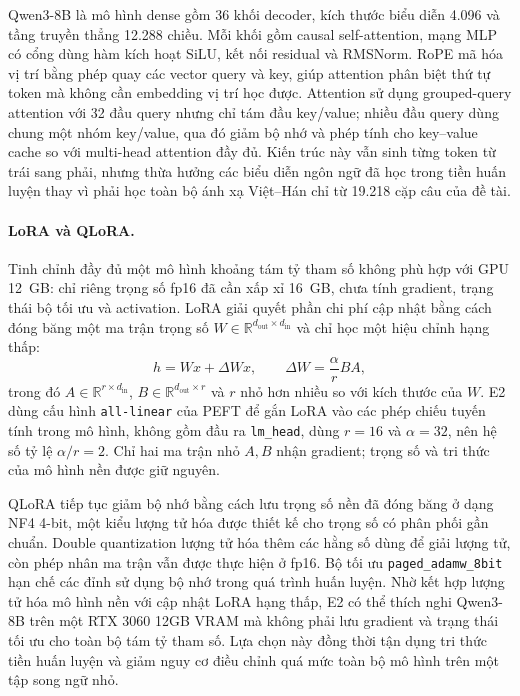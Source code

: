 \documentclass[11pt,twocolumn]{article}
\begin{document}
Qwen3-8B là mô hình dense gồm 36 khối decoder, kích thước biểu diễn 4.096 và
tầng truyền thẳng 12.288 chiều. Mỗi khối gồm causal self-attention, mạng MLP có
cổng dùng hàm kích hoạt SiLU, kết nối residual và RMSNorm. RoPE mã hóa vị trí
bằng phép quay các vector query và key, giúp attention phân biệt thứ tự token
mà không cần embedding vị trí học được. Attention sử dụng grouped-query
attention với 32 đầu query nhưng chỉ tám đầu key/value; nhiều đầu query dùng
chung một nhóm key/value, qua đó giảm bộ nhớ và phép tính cho key--value cache
so với multi-head attention đầy đủ. Kiến trúc này vẫn sinh từng token từ trái
sang phải, nhưng thừa hưởng các biểu diễn ngôn ngữ đã học trong tiền huấn luyện
thay vì phải học toàn bộ ánh xạ Việt--Hán chỉ từ 19.218 cặp câu của đề tài.

\paragraph{LoRA và QLoRA.}
Tinh chỉnh đầy đủ một mô hình khoảng tám tỷ tham số không phù hợp với GPU 12~GB:
chỉ riêng trọng số fp16 đã cần xấp xỉ 16~GB, chưa tính gradient, trạng thái bộ
tối ưu và activation. LoRA \citep{hu2021lora} giải quyết phần chi phí cập nhật
bằng cách đóng băng một ma trận trọng số $W\in\mathbb{R}^{d_{\mathrm{out}}
\times d_{\mathrm{in}}}$ và chỉ học một hiệu chỉnh hạng thấp:
\begin{equation}
h=Wx+\Delta Wx,
\qquad \Delta W=\frac{\alpha}{r}BA,
\end{equation}
trong đó $A\in\mathbb{R}^{r\times d_{\mathrm{in}}}$,
$B\in\mathbb{R}^{d_{\mathrm{out}}\times r}$ và $r$ nhỏ hơn nhiều so với kích
thước của $W$. E2 dùng cấu hình \texttt{all-linear} của PEFT để gắn LoRA
vào các phép chiếu tuyến tính trong mô hình, không gồm đầu ra
\texttt{lm\_head}, dùng $r=16$ và
$\alpha=32$, nên hệ số tỷ lệ $\alpha/r=2$. Chỉ hai ma trận nhỏ $A,B$ nhận
gradient; trọng số và tri thức của mô hình nền được giữ nguyên.

QLoRA \citep{dettmers2023qlora} tiếp tục giảm bộ nhớ bằng cách lưu trọng số nền
đã đóng băng ở dạng NF4 4-bit, một kiểu lượng tử hóa được thiết kế cho trọng số
có phân phối gần chuẩn. Double quantization lượng tử hóa thêm các hằng số dùng
để giải lượng tử, còn phép nhân ma trận vẫn được thực hiện ở fp16. Bộ tối ưu
\texttt{paged\_adamw\_8bit} hạn chế các đỉnh sử dụng bộ nhớ trong quá trình
huấn luyện. Nhờ kết hợp lượng tử hóa mô hình nền với cập nhật LoRA hạng thấp,
E2 có thể thích nghi Qwen3-8B trên một RTX 3060 12GB VRAM mà không phải lưu gradient và
trạng thái tối ưu cho toàn bộ tám tỷ tham số. Lựa chọn này đồng thời tận dụng
tri thức tiền huấn luyện và giảm nguy cơ điều chỉnh quá mức toàn bộ mô hình trên
một tập song ngữ nhỏ.
\end{document}
